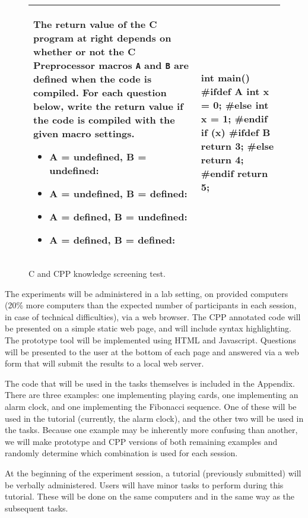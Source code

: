 \documentclass[11pt]{article}
\begin{document}
\begin{figure}
\centering
\begin{tabular}{|m{10cm}|m{3cm}|}
\hline
The return value of the C program at right depends on whether or not the C
Preprocessor macros \texttt{A} and \texttt{B} are defined when the code is
compiled.  For each question below, write the return value if the code is
compiled with the given macro settings.
%
\begin{itemize}[itemsep=1em]
\item A = undefined, B = undefined: 
\item A = undefined, B = defined: 
\item A = defined, B = undefined: 
\item A = defined, B = defined: 
\end{itemize}
&
\begin{code}
int main() {
#ifdef A
  int x = 0;
#else
  int x = 1;
#endif 
  if (x) {
#ifdef B
    return 3;
#else
    return 4;
#endif
  }
  return 5;
}
\end{code}
\\ \hline
\end{tabular}
\caption{C and CPP knowledge screening test.}
\label{fig:screen}
\end{figure}

The experiments will be administered in a lab setting, on provided computers
(20\% more computers than the expected number of participants in each session,
in case of technical difficulties), via a web browser.  The CPP annotated code
will be presented on a simple static web page, and will include syntax
highlighting.  The prototype tool will be implemented using HTML and
Javascript.  Questions will be presented to the user at the bottom of each page
and answered via a web form that will submit the results to a local web server.

The code that will be used in the tasks themselves is included in the Appendix.
There are three examples: one implementing playing cards, one implementing an
alarm clock, and one implementing the Fibonacci sequence.  One of these will be
used in the tutorial (currently, the alarm clock), and the other two will be
used in the tasks.  Because one example may be inherently more confusing than
another, we will make prototype and CPP versions of both remaining examples and
randomly determine which combination is used for each session.

At the beginning of the experiment session, a tutorial (previously submitted)
will be verbally administered.  Users will have minor tasks to perform during
this tutorial.  These will be done on the same computers and in the same way
as the subsequent tasks.
\end{document}

